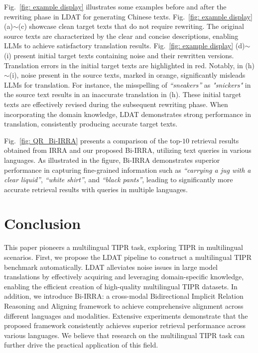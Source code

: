 \documentclass[10pt,journal,compsoc]{IEEEtran}
\begin{document}
Fig.~\ref{fig: example display} illustrates some examples before and after the rewriting phase in LDAT for generating Chinese texts. 
Fig.~\ref{fig: example display} (a)\(\sim\)(c) showcase clean target texts that do not require rewriting. The original source texts are characterized by the clear and concise descriptions, enabling LLMs to achieve satisfactory translation results. 
Fig.~\ref{fig: example display} (d)\(\sim\)(i) present initial target texts containing noise and their rewritten versions. Translation errors in the initial target texts are highlighted in red. 
Notably, in (h)\(\sim\)(i), noise present in the source texts, marked in orange, significantly misleads LLMs for translation. For instance, the misspelling of \textit{``sneakers''} as \textit{"snickers"} in the source text results in an inaccurate translation in (h). 
These initial target texts are effectively revised during the subsequent rewriting phase. When incorporating the domain knowledge, LDAT demonstrates strong performance in translation, consistently producing accurate target texts. 

Fig.~\ref{fig: QR_Bi-IRRA} presents a comparison of the top-\(10\) retrieval results obtained from IRRA and our proposed Bi-IRRA, utilizing text queries in various languages. As illustrated in the figure, Bi-IRRA demonstrates superior performance in capturing fine-grained information such as \textit{``carrying a jug
with a clear liquid''}, \textit{``white shirt''}, and \textit{``black pants''}, leading to significantly more accurate retrieval results with queries in multiple languages. 

\section{Conclusion}
This paper pioneers a multilingual TIPR task, exploring TIPR in multilingual scenarios. 
First, we propose the LDAT pipeline to construct a multilingual TIPR benchmark automatically. LDAT alleviates noise issues in large model translations by effectively acquiring and leveraging domain-specific knowledge, enabling the efficient creation of high-quality multilingual TIPR datasets.  
In addition, we introduce Bi-IRRA: a cross-modal Bidirectional Implicit Relation Reasoning and Aligning framework to achieve comprehensive alignment across different languages and modalities.
Extensive experiments demonstrate that the proposed framework consistently achieves superior retrieval performance across various languages. We believe that research on the multilingual TIPR task can further drive the practical application of this field.
\end{document}
